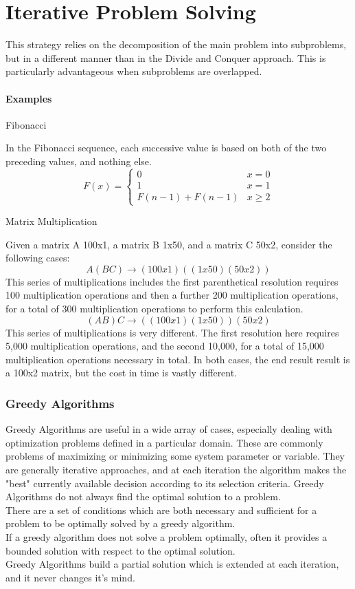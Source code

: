 \documentclass[12pt,letterpaper]{article}
\begin{document}
\part{Iterative Problem Solving}
This strategy relies on the decomposition of the main problem into subproblems, but in a different manner than in the Divide and Conquer approach. This is particularly advantageous when subproblems are overlapped.
\subsection{Examples}
\subparagraph{Fibonacci}
In the Fibonacci sequence, each successive value is based on both of the two preceding values, and nothing else. 
\[F(x)=\begin{cases}0 & x=0 \\ 1 & x=1 \\ F(n-1)+F(n-1) & x\geq 2 \end{cases}\]
\subparagraph{Matrix Multiplication} Given a matrix A 100x1, a matrix B 1x50, and a matrix C 50x2, consider the following cases:
\[A(BC)\to (100x1)((1x50)(50x2))\]
This series of multiplications includes the first parenthetical resolution requires 100 multiplication operations and then a further 200 multiplication operations, for a total of 300 multiplication operations to perform this calculation.
\[(AB)C \to ((100x1)(1x50))(50x2) \]
This series of multiplications is very different. The first resolution here requires 5,000 multiplication operations, and the second 10,000, for a total of 15,000 multiplication operations necessary in total. In both cases, the end result result is a 100x2 matrix, but the cost in time is vastly different. 
\section{Greedy Algorithms}
Greedy Algorithms are useful in a wide array of cases, especially dealing with optimization problems defined in a particular domain. These are commonly problems of maximizing or minimizing some system parameter or variable. They are generally iterative approaches, and at each iteration the algorithm makes the "best" currently available decision according to its selection criteria. Greedy Algorithms do not always find the optimal solution to a problem. \\
There are a set of conditions which are both necessary and sufficient for a problem to be optimally solved by a greedy algorithm. \\
If a greedy algorithm does not solve a problem optimally, often it provides a bounded solution with respect to the optimal solution.\\
Greedy Algorithms build a partial solution which is extended at each iteration, and it never changes it's mind. 
\end{document}
